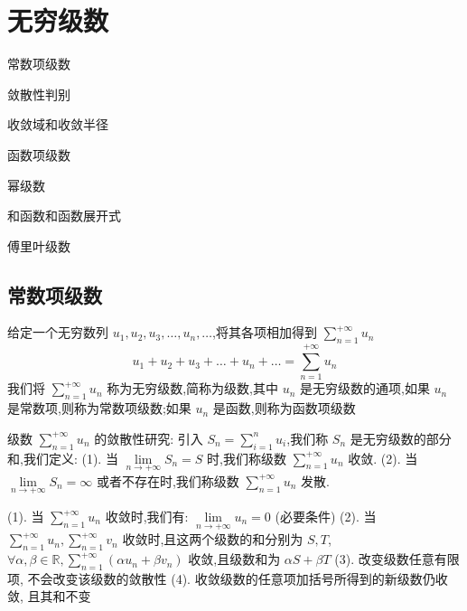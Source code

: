 \chapter{无穷级数}
\begin{introduction}
	\item 常数项级数
	\item 敛散性判别
	\item 收敛域和收敛半径
	\item 函数项级数
	\item 幂级数
	\item 和函数和函数展开式
	\item 傅里叶级数
\end{introduction}
\section{常数项级数}

\begin{definition}[级数定义]
	给定一个无穷数列 $u_{1},u_{2},u_{3},\dots,u_{n},\dots$,将其各项相加得到 $\sum\limits_{n=1}^{+\infty}u_{n}$
	$$u_{1}+u_{2}+u_{3}+\dots+u_{n}+\dots=\sum_{n=1}^{+\infty}u_{n}$$
	我们将 $\sum\limits_{n=1}^{+\infty}u_{n}$ 称为无穷级数,简称为级数,其中 $u_{n}$ 是无穷级数的通项,如果 $u_{n}$ 是常数项,则称为常数项级数;如果 $u_{n}$ 是函数,则称为函数项级数
\end{definition}
\begin{definition}[级数敛散性]
	级数 $\sum\limits_{n=1}^{+\infty}u_{n}$ 的敛散性研究:
	引入 $S_{n}=\sum\limits_{i=1}^{n}u_{i}$,我们称 $S_{n}$ 是无穷级数的部分和,我们定义:
	(1). 当 $\lim\limits_{n\rightarrow +\infty}S_{n}=S$ 时,我们称级数 $\sum\limits_{n=1}^{+\infty}u_{n}$ 收敛.
	(2). 当 $\lim\limits_{n\rightarrow +\infty}S_{n}=\infty$ 或者不存在时,我们称级数 $\sum\limits_{n=1}^{+\infty}u_{n}$ 发散.
\end{definition}

\begin{corollary}
	(1). 当 $\sum\limits_{n=1}^{+\infty}u_{n}$ 收敛时,我们有:  $\lim\limits_{n\rightarrow +\infty}u_{n}=0$ (必要条件)
	(2). 当 $\sum\limits_{n=1}^{+\infty}u_{n},\sum\limits_{n=1}^{+\infty}v_{n}$ 收敛时,且这两个级数的和分别为 $S,T$, $\forall \alpha ,\beta \in \mathbb{R} ,\sum\limits_{n=1}^{+\infty}(\alpha u_{n}+\beta v_{n})$ 收敛,且级数和为 $\alpha S+\beta T$
	(3). 改变级数任意有限项, 不会改变该级数的敛散性
	(4). 收敛级数的任意项加括号所得到的新级数仍收敛, 且其和不变
\end{corollary}

